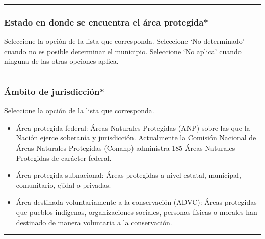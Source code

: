 \documentclass[
]{book}
\providecommand{\tightlist}{%
  \setlength{\itemsep}{0pt}\setlength{\parskip}{0pt}}
\begin{document}
\begin{center}\rule{0.5\linewidth}{0.5pt}\end{center}

\hypertarget{estado-en-donde-se-encuentra-el-uxe1rea-protegida}{%
\subsubsection*{\texorpdfstring{{Estado en donde se encuentra el área protegida*}}{Estado en donde se encuentra el área protegida*}}\label{estado-en-donde-se-encuentra-el-uxe1rea-protegida}}

Seleccione la opción de la lista que corresponda.
Seleccione `No determinado' cuando no es posible determinar el municipio.
Seleccione `No aplica' cuando ninguna de las otras opciones aplica.

\begin{center}\rule{0.5\linewidth}{0.5pt}\end{center}

\hypertarget{uxe1mbito-de-jurisdicciuxf3n}{%
\subsubsection*{\texorpdfstring{{Ámbito de jurisdicción*}}{Ámbito de jurisdicción*}}\label{uxe1mbito-de-jurisdicciuxf3n}}

Seleccione la opción de la lista que corresponda.

\begin{itemize}
\tightlist
\item
  Área protegida federal: Áreas Naturales Protegidas (ANP) sobre las que la Nación ejerce soberanía y jurisdicción. Actualmente la Comisión Nacional de Áreas Naturales Protegidas (Conanp) administra 185 Áreas Naturales Protegidas de carácter federal.
\item
  Área protegida subnacional: Áreas protegidas a nivel estatal, municipal, comunitario, ejidal o privadas.
\item
  Área destinada voluntariamente a la conservación (ADVC): Áreas protegidas que pueblos indígenas, organizaciones sociales, personas físicas o morales han destinado de manera voluntaria a la conservación.
\end{itemize}

\begin{center}\rule{0.5\linewidth}{0.5pt}\end{center}
\end{document}
